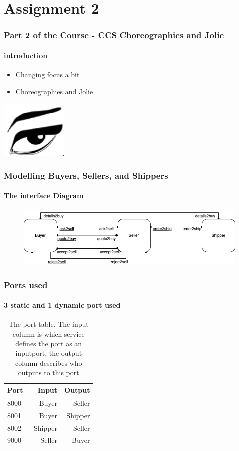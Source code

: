 \documentclass{beamer}
\begin{document}
    \section{Assignment 2}
    \begin{frame}[t]
        \frametitle{Part 2 of the Course - CCS Choreographies and Jolie}
        \framesubtitle{introduction}
        \begin{itemize}
            \item Changing focus a bit %
            \item Choreographies and Jolie
        \end{itemize}
        \includegraphics[width=0.2\linewidth]{images/jolielang.png}
    \end{frame}
    \begin{frame}[t]
        \frametitle{Modelling Buyers, Sellers, and Shippers}
        \framesubtitle{The interface Diagram}
        \begin{figure}
            \centering
            \includegraphics[width=0.8\linewidth]{images/InterfaceDiagram.png}
        \end{figure}
    \end{frame}
    \begin{frame}[t]
        \frametitle{Ports used}
        \framesubtitle{3 static and 1 dynamic port used}
        \begin{table}[!htb]
            \centering
            \begin{tabular}{l | r | r}
                Port & Input   & Output \\\hline
                8000 & Buyer   & Seller \\
                8001 & Buyer   & Shipper\\
                8002 & Shipper & Seller \\\hline
                9000+& Seller  & Buyer
            \end{tabular}
            \caption{The port table. The input column is which service defines the port as an inputport, 
            the output column describes who outputs to this port}
            \label{tab:portmap}
        \end{table}
        
    \end{frame}
\end{document}

